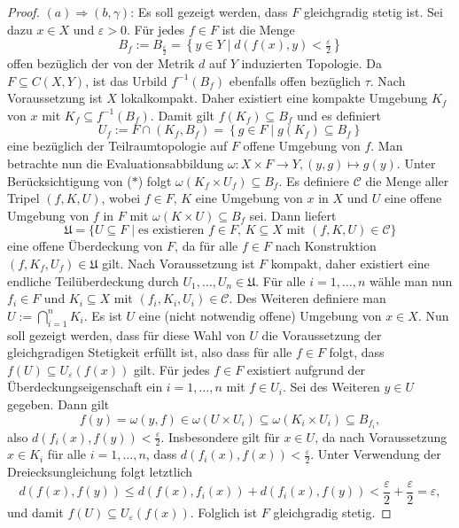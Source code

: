 \begin{proof}
  $(a) \Rightarrow (b, \gamma)$:
  Es soll gezeigt werden, dass $F$ gleichgradig stetig ist.
  Sei dazu $x \in X$ und $\varepsilon > 0$.
  Für jedes $f \in F$ ist die Menge
  \begin{displaymath}
    B_f := B_{\frac{\varepsilon}{2}} = \left\{ y \in Y \mid d(f(x),y) < \tfrac{\varepsilon}{2}\right\} 
  \end{displaymath}
  offen bezüglich der von der Metrik $d$ auf $Y$ induzierten Topologie.
  Da $F \subseteq C(X,Y)$, ist das Urbild $f^{-1}(B_f)$ ebenfalls offen bezüglich $\tau$.
  Nach Voraussetzung ist $X$ lokalkompakt.
  Daher existiert eine kompakte Umgebung $K_f$ von $x$ mit $K_f \subseteq f^{-1}(B_f)$.
  Damit gilt $f(K_f) \subseteq B_f$ und es definiert
  \begin{displaymath}
    U_f := F \cap (K_f, B_f) = \left\{g \in F \mid g(K_f) \subseteq B_f \right\} \tag{$\ast$}
  \end{displaymath}
  eine bezüglich der Teilraumtopologie auf $F$ offene Umgebung von $f$.
  Man betrachte nun die Evaluationsabbildung $\omega: X \times F \to Y, (y,g) \mapsto g(y)$.
  Unter Berücksichtigung von ($\ast$) folgt $\omega(K_f \times U_f) \subseteq B_f$.
  Es definiere $\mathcal{C}$ die Menge aller Tripel $(f,K,U)$, wobei $f \in F$, $K$ eine Umgebung von $x$ in $X$ und $U$ eine offene Umgebung von $f$ in $F$ mit $\omega(K \times U) \subseteq B_f$ sei.
  Dann liefert
  \begin{displaymath}
    \mathfrak{U} = \{ U \subseteq F \mid \text{es existieren $f \in F$, $K \subseteq X$ mit $(f,K,U) \in \mathcal C$} \}
  \end{displaymath}
  eine offene Überdeckung von $F$, da für alle $f \in F$ nach Konstruktion $(f,K_f,U_f) \in \mathfrak{U}$ gilt.
  Nach Voraussetzung ist $F$ kompakt, daher existiert eine endliche Teilüberdeckung durch $U_1,\dots,U_n \in \mathfrak{U}$.
  Für alle $i = 1,\dots,n$ wähle man nun $f_i \in F$ und $K_i \subseteq X$ mit $(f_i, K_i, U_i) \in \mathcal{C}$.
  Des Weiteren definiere man $U := \bigcap_{i = 1}^n K_i$.
  Es ist $U$ eine (nicht notwendig offene) Umgebung von $x \in X$.
  Nun soll gezeigt werden, dass für diese Wahl von $U$ die Voraussetzung der gleichgradigen Stetigkeit erfüllt ist, also dass für alle $f \in F$ folgt, dass $f(U) \subseteq U_\varepsilon(f(x))$ gilt.
  Für jedes $f \in F$ existiert aufgrund der Überdeckungseigenschaft ein $i = 1,\dots,n$ mit $f \in U_i$.
  Sei des Weiteren $y \in U$ gegeben.
  Dann gilt
  \begin{displaymath}
    f(y) = \omega(y,f) \in \omega(U \times U_i) \subseteq \omega(K_i \times U_i) \subseteq B_{f_i},
  \end{displaymath}
  also $d(f_i(x),f(y)) < \tfrac{\varepsilon}{2}$.
  Insbesondere gilt für $x \in U$, da nach Voraussetzung $x \in K_i$ für alle $i = 1,\dots,n$, dass $d(f_i(x),f(x)) < \tfrac{\varepsilon}{2}$.
  Unter Verwendung der Dreiecksungleichung folgt letztlich
  \begin{displaymath}
    d(f(x),f(y)) \leq d(f(x),f_i(x)) + d(f_i(x),f(y)) < \frac{\varepsilon}{2} + \frac{\varepsilon}{2} = \varepsilon,
  \end{displaymath}
  und damit $f(U) \subseteq U_\varepsilon(f(x))$.
  Folglich ist $F$ gleichgradig stetig.


\end{proof}
